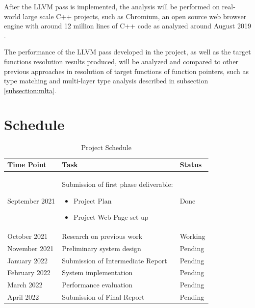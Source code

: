 \documentclass[12pt]{article}
\begin{document}
After the LLVM pass is implemented, the analysis will be performed on real-world large scale C++ projects, such as Chromium, an open source web browser engine with around 12 million lines of C++ code as analyzed around August 2019 \cite{chromium-loc}.

The performance of the LLVM pass developed in the project, as well as the target functions resolution results produced, will be analyzed and compared to other previous approaches in resolution of target functions of function pointers, such as type matching \cite{modular-cfi} and multi-layer type analysis \cite{mlta} described in subsection \ref{subsection:mlta}.

\newpage
\section{Schedule}

\begin{table}[h]
    \centering
    \begin{tabular}{ | m{3cm} | m{7cm}| m{1.5cm} | } 
     \hline
     Time Point & Task & Status \\
     \hline
     \hline
     September 2021 & 
     Submission of first phase deliverable:
     \begin{itemize}
         \item Project Plan
         \item Project Web Page set-up
     \end{itemize} &
     Done
     \\[0.5cm]
     \hline
     October 2021 & 
     Research on previous work &
     Working
     \\[0.5cm]
     \hline
     November 2021 & 
     Preliminary system design &
     Pending
     \\[0.5cm]
     \hline
     January 2022 & 
     Submission of Intermediate Report &
     Pending
     \\[0.5cm]
     \hline
     February 2022 & 
     System implementation &
     Pending
     \\[0.5cm]
     \hline
     March 2022 & 
     Performance evaluation &
     Pending
     \\[0.5cm]
     \hline
     April 2022 & 
     Submission of Final Report &
     Pending
     \\[0.5cm]
     \hline
    \end{tabular}
    \caption{Project Schedule}
    \label{tab:schedule}
\end{table}

\newpage

\printbibliography
\end{document}
